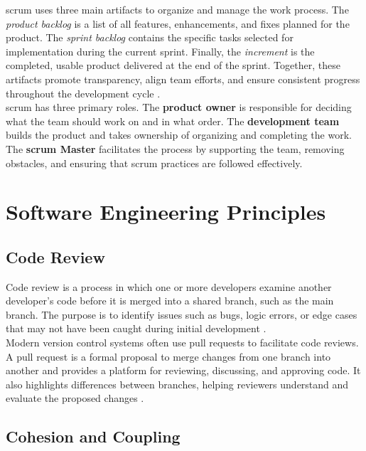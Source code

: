 \newpage

\gls{scrum} uses three main artifacts to organize and manage the work process. The \textit{product backlog} is a list of all features, enhancements, and fixes planned for the product. The \textit{sprint backlog} contains the specific tasks selected for implementation during the current sprint. Finally, the \textit{increment} is the completed, usable product delivered at the end of the sprint. Together, these artifacts promote transparency, align team efforts, and ensure consistent progress throughout the development cycle \cite{scrumguides:scrum}. \\

\gls{scrum} has three primary roles. The \textbf{product owner} is responsible for deciding what the team should work on and in what order. The \textbf{development team} builds the product and takes ownership of organizing and completing the work. The \textbf{\gls{scrum} Master} facilitates the process by supporting the team, removing obstacles, and ensuring that \gls{scrum} practices are followed effectively.\\


\section{Software Engineering Principles}
\label{sec:software-engineering-principles}

\subsection{Code Review}
\label{subsec:code-review}

Code review is a process in which one or more developers examine another developer’s code before it is merged into a shared branch, such as the main branch. The purpose is to identify issues such as bugs, logic errors, or edge cases that may not have been caught during initial development \cite{gitlab:code-review}. \\

Modern version control systems often use pull requests to facilitate code reviews. A pull request is a formal proposal to merge changes from one branch into another and provides a platform for reviewing, discussing, and approving code. It also highlights differences between branches, helping reviewers understand and evaluate the proposed changes \cite{github:pr}.

\subsection{Cohesion and Coupling}
\label{subsec:cohesion-and-coupling}

